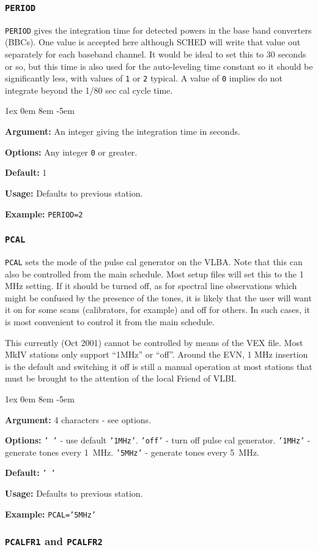 \documentclass{report}
\newcommand{\rcwbox}[5]{
  \begin{list}{}{\parsep 1ex  \itemsep 0em
                 \leftmargin 8em  \itemindent -5em }
    \item {\bf Argument:} #1
    \item {\bf Options:}  #2
    \item {\bf Default:}  #3
    \item {\bf Usage:}    #4
    \item {\bf Example:}  #5
  \end{list}
}
\begin{document}
\subsubsection{\label{SP:PERIOD}{\tt PERIOD}}

{\tt PERIOD} gives the integration time for detected powers in the
base band converters (BBCs). One value is accepted here although {\sc
SCHED} will write that value out separately for each baseband
channel. It would be ideal to set this to 30 seconds or so, but this
time is also used for the auto-leveling time constant so it should be
significantly less, with values of {\tt 1} or {\tt 2} typical. A value
of {\tt 0} implies do not integrate beyond the 1/80 sec cal cycle
time.

\rcwbox
{An integer giving the integration time in seconds.}
{Any integer {\tt 0} or greater.}
{1}
{Defaults to previous station.}
{{\tt PERIOD=2}}


\subsubsection{\label{SP:PCAL}{\tt PCAL}}

{\tt PCAL} sets the mode of the pulse cal generator on the VLBA.  Note
that this can also be controlled from the main schedule.  Most setup
files will set this to the 1 MHz setting.  If it should be turned
off, as for spectral line observations which might be confused by
the presence of the tones, it is likely that the user will want it
on for some scans (calibrators, for example) and off for others.  In
such cases, it is most convenient to control it from the main
schedule.

This currently (Oct 2001) cannot be controlled by means of the VEX
file. Most MkIV stations only support ``1MHz'' or ``off''. Around the
EVN, 1 MHz insertion is the default and switching it off is still a
manual operation at most stations that must be brought to the attention
of the local Friend of VLBI.

\rcwbox
{4 characters - see options.}
{{\tt ' '} - use default {\tt '1MHz'}. {\tt 'off'} - turn off pulse
cal generator. {\tt '1MHz'} - generate tones every 1~MHz. {\tt '5MHz'}
- generate tones every 5~MHz.}
{{\tt ' '}}
{Defaults to previous station.}
{{\tt PCAL='5MHz'}}


\subsubsection{\label{SP:PCALFR1}{\tt PCALFR1} and {\tt PCALFR2}}
\end{document}
